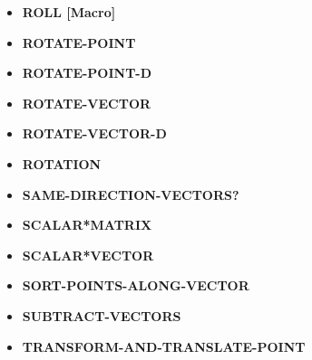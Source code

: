 \documentclass [11pt]{book}
\begin{document}
\begin{itemize}
\item {}
\textbf{ROLL [Macro]}





\item {}
\textbf{ROTATE-POINT}





\item {}
\textbf{ROTATE-POINT-D}





\item {}
\textbf{ROTATE-VECTOR}





\item {}
\textbf{ROTATE-VECTOR-D}





\item {}
\textbf{ROTATION}





\item {}
\textbf{SAME-DIRECTION-VECTORS?}





\item {}
\textbf{SCALAR*MATRIX}





\item {}
\textbf{SCALAR*VECTOR}





\item {}
\textbf{SORT-POINTS-ALONG-VECTOR}





\item {}
\textbf{SUBTRACT-VECTORS}





\item {}
\textbf{TRANSFORM-AND-TRANSLATE-POINT}






\end{itemize}
\end{document}
